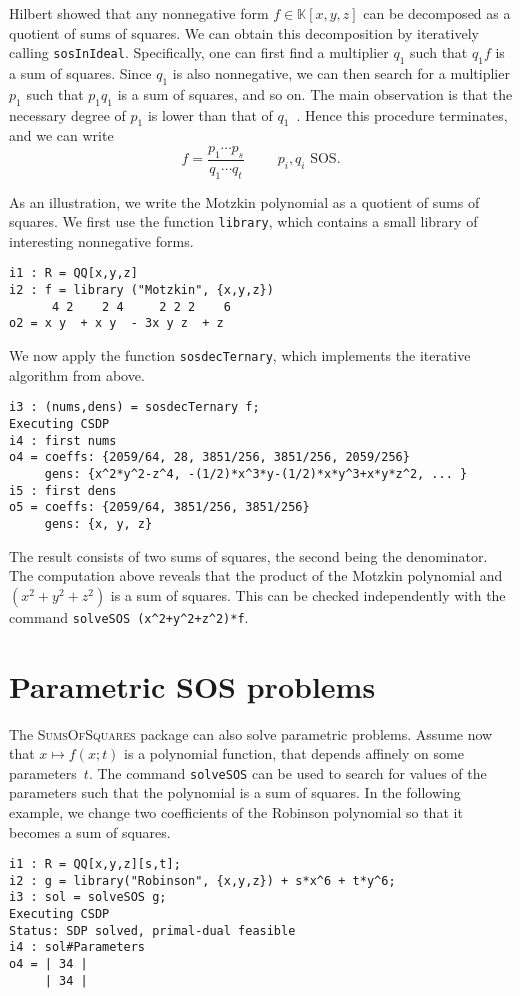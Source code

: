 \documentclass[11pt]{amsart}
\theoremstyle{plain}%
\theoremstyle{definition}
\theoremstyle{remark}
\newcommand{\SOS}{\textsc{SumsOfSquares}\xspace}
\newcommand{\kk}{\mathbb{K}}
\begin{document}
Hilbert showed that any nonnegative form $f\in \kk[x,y,z]$ can be decomposed as a quotient of sums of squares.
We can obtain this decomposition by iteratively calling \verb|sosInIdeal|.
Specifically, one can first find a multiplier $q_{1}$ such that $q_{1}f$ is a sum of squares.
Since $q_1$ is also nonnegative, we can then search for a multiplier $p_{1}$ such that $p_{1}q_{1}$ is a sum of squares, and so on.
The main observation is that the necessary degree of $p_{1}$ is lower than that of $q_{1}$~\cite{de2004products}.
Hence this procedure terminates, and we can write
\[
  f = \frac{p_{1}\cdots p_{s}}{q_{1}\cdots q_{t}} \qquad \text {
    $p_{i},q_{i}$ SOS}.
\]

As an illustration, we write the Motzkin polynomial as a quotient of sums of squares.
We first use the function \verb|library|, which contains a small library of interesting nonnegative forms.
{\small
\begin{verbatim}
i1 : R = QQ[x,y,z]
i2 : f = library ("Motzkin", {x,y,z})
      4 2    2 4     2 2 2    6
o2 = x y  + x y  - 3x y z  + z
\end{verbatim}
}
\noindent
We now apply the function \verb|sosdecTernary|, which implements the iterative algorithm from above.
{\small
\begin{verbatim}
i3 : (nums,dens) = sosdecTernary f;
Executing CSDP
i4 : first nums
o4 = coeffs: {2059/64, 28, 3851/256, 3851/256, 2059/256}
     gens: {x^2*y^2-z^4, -(1/2)*x^3*y-(1/2)*x*y^3+x*y*z^2, ... }
i5 : first dens
o5 = coeffs: {2059/64, 3851/256, 3851/256}
     gens: {x, y, z}
\end{verbatim}
}
\noindent
The result consists of two sums of squares, the second being the denominator.
The computation above reveals that the product of the Motzkin polynomial and $(x^2{+}y^2{+}z^2)$ is a sum of squares.
This can be checked independently with the command \verb|solveSOS (x^2+y^2+z^2)*f|.

\section{Parametric SOS problems}

The \SOS package can also solve parametric problems.
Assume now that $x \mapsto f(x;t)$ is a polynomial function, that depends affinely on some parameters~$t$.
The command \verb|solveSOS| can be used to search for values of the parameters such that the polynomial is a sum of squares.
In the following example, we change two coefficients of the Robinson polynomial so that it becomes a sum of squares.
{\small
\begin{verbatim}
i1 : R = QQ[x,y,z][s,t];
i2 : g = library("Robinson", {x,y,z}) + s*x^6 + t*y^6;
i3 : sol = solveSOS g;
Executing CSDP
Status: SDP solved, primal-dual feasible
i4 : sol#Parameters
o4 = | 34 |
     | 34 |
\end{verbatim}
}
\end{document}
